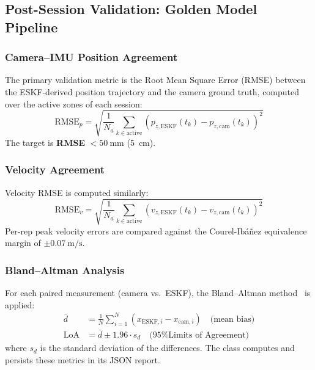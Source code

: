 \subsection{Post-Session Validation: Golden Model Pipeline}

\subsubsection{Camera--IMU Position Agreement}

The primary validation metric is the Root Mean Square Error (RMSE) between the ESKF-derived position trajectory and the camera ground truth, computed over the active zones of each session:
\begin{equation}
  \text{RMSE}_p = \sqrt{\frac{1}{N_a}\sum_{k \in \text{active}} \left(p_{z,\text{ESKF}}(t_k) - p_{z,\text{cam}}(t_k)\right)^2}
\end{equation}
The target is \textbf{RMSE} $< \SI{50}{\milli\metre}$ (\SI{5}{\centi\metre}).

\subsubsection{Velocity Agreement}

Velocity RMSE is computed similarly:
\begin{equation}
  \text{RMSE}_v = \sqrt{\frac{1}{N_a}\sum_{k \in \text{active}} \left(v_{z,\text{ESKF}}(t_k) - v_{z,\text{cam}}(t_k)\right)^2}
\end{equation}
Per-rep peak velocity errors are compared against the Courel-Ib\'{a}\~{n}ez equivalence margin of $\pm\SI{0.07}{\metre\per\second}$.

\subsubsection{Bland--Altman Analysis}

For each paired measurement (camera vs.\ ESKF), the Bland--Altman method~\cite{bland1986} is applied:
\begin{align}
  \bar{d}  &= \frac{1}{N}\sum_{i=1}^{N}(x_{\text{ESKF},i} - x_{\text{cam},i}) \quad \text{(mean bias)} \\
  \text{LoA} &= \bar{d} \pm 1.96 \cdot s_d \quad \text{(95\% Limits of Agreement)}
\end{align}
where $s_d$ is the standard deviation of the differences.
The  class computes and persists these metrics in its JSON report.

